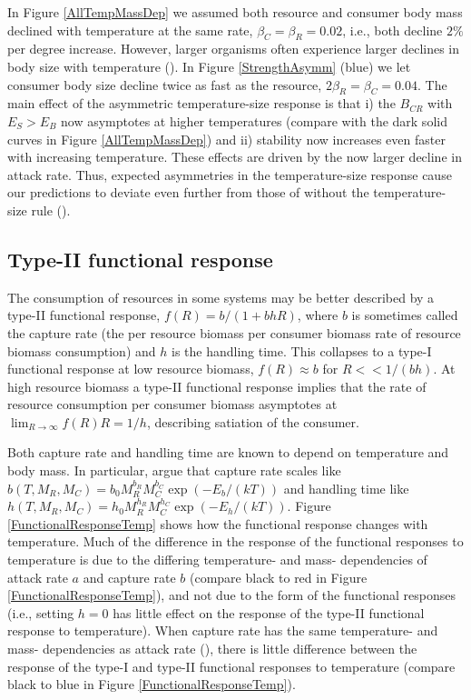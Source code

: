 \documentclass[11pt]{article}
\begin{document}
In Figure \ref{AllTempMassDep} we assumed both resource and consumer body mass declined with temperature at the same rate, $\beta_C = \beta_R = 0.02$, i.e., both decline $2\%$ per degree increase.
However, larger organisms often experience larger declines in body size with temperature (\cite{Forster2012}).
In Figure \ref{StrengthAsymm} (blue) we let consumer body size decline twice as fast as the resource, $2 \beta_R = \beta_C = 0.04$.
The main effect of the asymmetric temperature-size response is that i) the $B_{CR}$ with $E_S > E_B$ now asymptotes at higher temperatures (compare with the dark solid curves in Figure \ref{AllTempMassDep}) and ii) stability now increases even faster with increasing temperature.
These effects are driven by the now larger decline in attack rate.
Thus, expected asymmetries in the temperature-size response cause our predictions to deviate even further from those of without the temperature-size rule (\cite{Gilbert2014}).

\subsection*{Type-II functional response}

The consumption of resources in some systems may be better described by a type-II functional response, $f(R) = b / (1 + b h R)$, where $b$ is sometimes called the capture rate (the per resource biomass per consumer biomass rate of resource biomass consumption) and $h$ is the handling time.
This collapses to a type-I functional response at low resource biomass, $f(R) \approx b$ for $R << 1/(b h)$.
At high resource biomass a type-II functional response implies that the rate of resource consumption per consumer biomass asymptotes at $\lim_{R\rightarrow\infty}f(R) R = 1/h$, describing satiation of the consumer.

Both capture rate and handling time are known to depend on temperature and body mass.
In particular, \cite{Rall2012} argue that capture rate scales like $b(T, M_R, M_C) = b_0 M_R^{b_R} M_C^{b_C} \exp(-E_b/(k T))$ and handling time like $h(T, M_R, M_C) = h_0 M_R^{h_R} M_C^{h_C} \exp(-E_h/(k T))$.
Figure \ref{FunctionalResponseTemp} shows how the functional response changes with temperature.
Much of the difference in the response of the functional responses to temperature is due to the differing temperature- and mass- dependencies of attack rate $a$ and capture rate $b$ (compare black to red in Figure \ref{FunctionalResponseTemp}), and not due to the form of the functional responses (i.e., setting $h=0$ has little effect on the response of the type-II functional response to temperature).
When capture rate has the same temperature- and mass- dependencies as attack rate (\cite{Gilbert2014}), there is little difference between the response of the type-I and type-II functional responses to temperature (compare black to blue in Figure \ref{FunctionalResponseTemp}).
\end{document}
